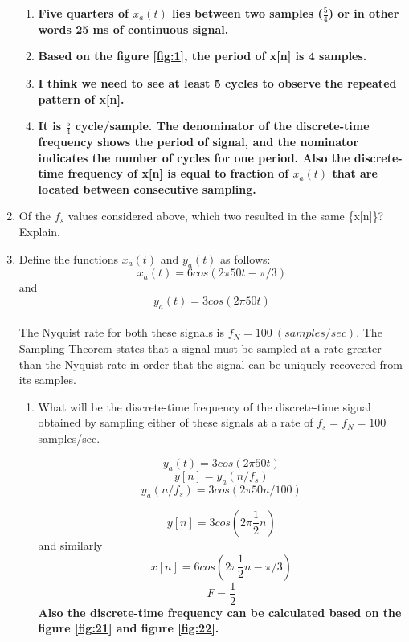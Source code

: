 \documentclass[12pt]{article}
\begin{document}
\begin{enumerate}
\begin{enumerate}
\item \textbf{Five quarters of $x_a(t)$ lies between two samples ($\frac{5}{4}$) or in other words 25 ms of continuous signal.}

\item \textbf{Based on the figure \ref{fig:1}, the period of x[n] is 4 samples.}

\item \textbf{I think we need to see at least 5 cycles to observe the repeated pattern of x[n].}

\item \textbf{It is $\frac{5}{4}$ cycle/sample. The denominator of the discrete-time frequency shows the period of signal, and the nominator indicates the number of cycles for one period. Also the discrete-time frequency of x[n] is equal to fraction of $x_a(t)$ that are located between consecutive sampling.}
\end{enumerate}


\item Of the $f_s$ values considered above, which two resulted in the same \{x[n]\}? Explain.



\item Define the functions $x_a(t)$ and $y_a(t)$ as follows:\\
$$x_a(t) = 6 cos(2\pi50t - \pi/3)$$ and $$y_a(t) = 3 cos(2\pi50t)$$\\
The Nyquist rate for both these signals is $f_N = 100\ (samples/sec)$. The Sampling Theorem states that a signal must be sampled at a rate greater than the Nyquist rate in order that the signal can be uniquely recovered from its samples.


\begin{enumerate}
\item What will be the discrete-time frequency of the discrete-time signal obtained by sampling either of these signals at a rate of $f_s = f_N = 100$ samples/sec.

$$y_a(t) = 3 cos(2\pi50t)$$
$$y[n] = y_a(n/f_s)$$
$$y_a(n/f_s) = 3 cos(2\pi50n/100)$$

$$y[n] = 3 cos(2\pi\frac{1}{2}n)$$
 and similarly
$$x[n] = 6 cos(2\pi\frac{1}{2}n - \pi/3)$$
\textbf{
$$\boxed{F = \frac{1}{2}}$$
}
\textbf{Also the discrete-time frequency can be calculated based on the figure \ref{fig:21} and figure \ref{fig:22}.}



\end{enumerate}
\end{enumerate}
\end{document}
